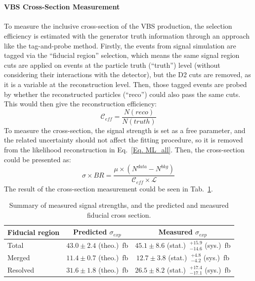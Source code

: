 \\
\\{\bf VBS Cross-Section Measurement}
\\
\\To measure the inclusive cross-section of the VBS production, the selection efficiency is estimated with the generator truth information through an approach like the tag-and-probe method. Firstly, the events from signal simulation are tagged via the ``fiducial region'' selection, which means the same signal region cuts are applied on events at the particle truth (``truth'') level (without considering their interactions with the detector), but the D2 cuts are removed, as it is a variable at the reconstruction level. Then, those tagged events are probed by whether the reconstructed particles (``reco'') could also pass the same cuts. This would then give the reconstruction efficiency:
\begin{equation}
\mathcal{C}_{eff} = \frac{N(reco)}{N(truth)} 
\end{equation}  
To measure the cross-section, the signal strength is set as a free parameter, and the related uncertainty should not affect the fitting procedure, so it is removed from the likelihood reconstruction in Eq.~\ref{Eq. ML_all}. Then, the cross-section could be presented as:
\begin{equation}
\sigma\times BR=\frac{\mu\times (N^{data}-N^{bkg})}{\mathcal{C}_{eff}\times\mathcal{L}}
\end{equation}
The result of the cross-section measurement could be seen in Tab.~\ref{tab:obs_mu_fidxs}.
\begin{table}[htb] 
	\centering
	\begin{tabular}{lcc}
		\hline
		Fiducial region  & Predicted $\sigma_{exp} $  & Measured $\sigma_{exp}$ \\
		\hline
		Total    & $43.0 \pm 2.4 $ (theo.)~fb  &  $45.1 \pm 8.6$ (stat.) $~^{+15.9}_{-14.6}$ (sys.)~fb \\
		Merged   & $11.4  \pm 0.7 $ (theo.)~fb  & $12.7 \pm 3.8$ (stat.) $~^{+4.8}_{-4.2}$ (sys.)~fb \\
		Resolved & $31.6 \pm 1.8 $ (theo.)~fb  &  $26.5 \pm 8.2$ (stat.) $~^{+17.4}_{-17.1}$ (sys.)~fb \\
		\hline 
	\end{tabular}
	\caption{Summary of measured signal strengths, and the predicted and measured fiducial cross section.
	}
	\label{tab:obs_mu_fidxs}  
\end{table}

